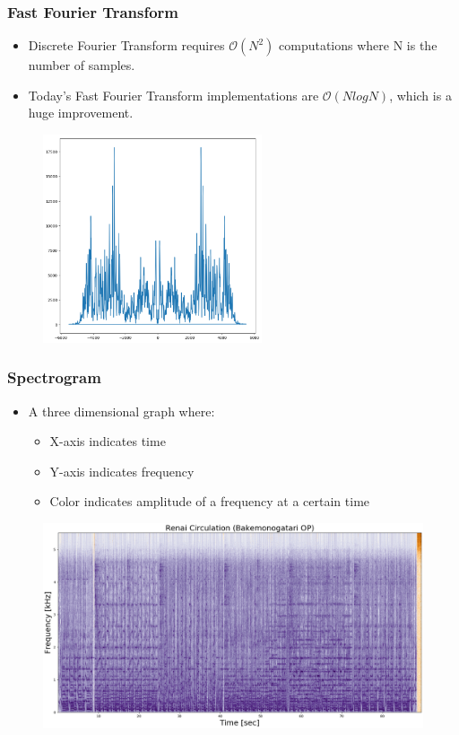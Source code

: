 \documentclass{beamer}
\begin{document}
\begin{frame}[t]
    \frametitle{Fast Fourier Transform}
    \begin{itemize}
        \item Discrete Fourier Transform requires \(\mathcal{O}(N^2)\) computations where N is the number of samples.
        \item Today's Fast Fourier Transform implementations are \(\mathcal{O}(NlogN)\), which is a huge improvement.
    \end{itemize}
    \begin{figure}
        \includegraphics[width=0.575\textwidth]{fft.png}
    \end{figure}
\end{frame}

\begin{frame}[t]
    \frametitle{Spectrogram}
    \begin{itemize}
        \item A three dimensional graph where:
        \begin{itemize}
            \item X-axis indicates time
            \item Y-axis indicates frequency
            \item Color indicates amplitude of a frequency at a certain time
        \end{itemize}
    \end{itemize}
    \vspace{-0.6cm}
    \begin{figure}
        \centering
        \includegraphics[width=1.000325\textwidth]{Spectrogram_Specimens/ActualSong.png}
    \end{figure}
\end{frame}
\end{document}
